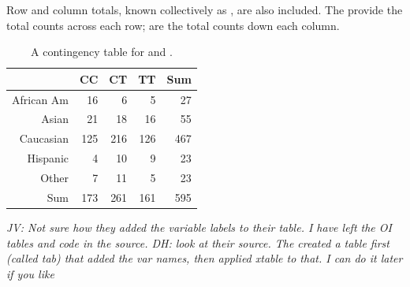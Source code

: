 \begin{doublespace}
Row and column totals, known collectively as , are also included. The  provide the total counts across each row;  are the total counts down each column.

\begin{table}[ht]
	\centering
	\begin{tabular}{rrrrr}
		\hline
		& CC & CT & TT & Sum \\ 
		\hline
		African Am & 16 & 6 & 5 & 27 \\ 
		Asian & 21 & 18 & 16 & 55 \\ 
		Caucasian & 125 & 216 & 126 & 467 \\ 
		Hispanic & 4 & 10 & 9 & 23 \\ 
		Other & 7 & 11 & 5 & 23 \\ 
		Sum & 173 & 261 & 161 & 595 \\ 
		\hline
	\end{tabular}
	\caption{A contingency table for  and .} 
	\label{famussContingencyTable}
\end{table}

\textit{JV: Not sure how they added the variable labels to their table. I have left the OI tables and code in the source.  DH: look at their source.  The created a table first (called tab) that added the var names, then applied xtable to that.  I can do it later if you like}

\end{doublespace}
